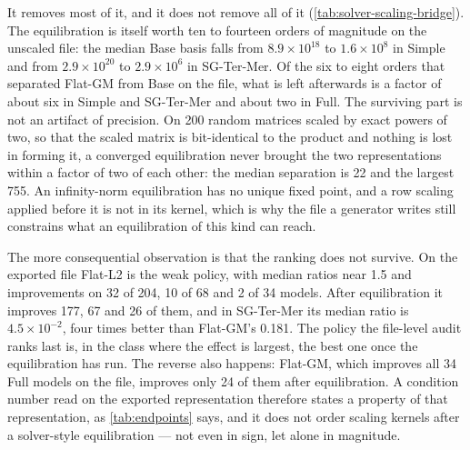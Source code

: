\documentclass[smallextended,envcountsect,envcountsame]{svjour3}
\begin{document}
It removes most of it, and it does not remove all of it
(\cref{tab:solver-scaling-bridge}). The equilibration is itself worth ten to fourteen orders of
magnitude on the unscaled file: the median Base basis falls from $8.9\times10^{18}$ to
$1.6\times10^{8}$ in Simple and from $2.9\times10^{20}$ to $2.9\times10^{6}$ in SG-Ter-Mer. Of
the six to eight orders that separated Flat-GM from Base on the file, what is left afterwards
is a factor of about six in Simple and SG-Ter-Mer and about two in Full. The surviving part is
not an artifact of precision. On 200 random matrices scaled by exact powers of two, so that the
scaled matrix is bit-identical to the product and nothing is lost in forming it, a converged
equilibration never brought the two representations within a factor of two of each other: the
median separation is 22 and the largest 755. An infinity-norm equilibration has no unique fixed
point, and a row scaling applied before it is not in its kernel, which is why the file a
generator writes still constrains what an equilibration of this kind can reach.

The more consequential observation is that the ranking does not survive. On the exported file
Flat-L2 is the weak policy, with median ratios near 1.5 and improvements on 32 of 204, 10 of 68
and 2 of 34 models. After equilibration it improves 177, 67 and 26 of them, and in SG-Ter-Mer
its median ratio is $4.5\times10^{-2}$, four times better than Flat-GM's 0.181. The policy the
file-level audit ranks last is, in the class where the effect is largest, the best one once the
equilibration has run. The reverse also happens: Flat-GM, which improves all 34 Full models on the
file, improves only 24 of them after equilibration. A condition number read on the exported
representation therefore states a property of that representation, as
\cref{tab:endpoints} says, and it does not order scaling kernels after a solver-style
equilibration --- not even in sign, let alone in magnitude.

\begin{table}[tb]
\centering\small
\caption{What survives a solver-style scaling. For each class the first row is the median
$\kappa_1$ of the Base basis; the others give the median per-instance ratio
$\kappa_1(\text{policy})/\kappa_1(\text{Base})$ with, in parentheses, the number of models on
which the policy lowers $\kappa_1$. Columns are the exported file and the same bases after two
and ten passes of power-of-two row-and-column equilibration.}
\label{tab:solver-scaling-bridge}

\end{table}
\end{document}
